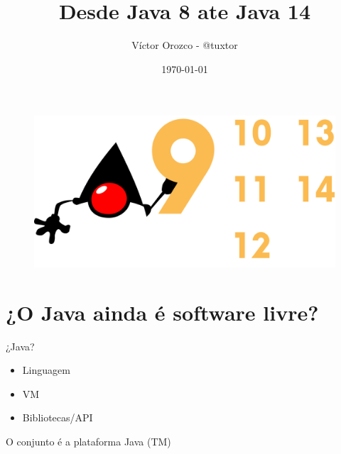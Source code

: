 \documentclass[aspectratio=169]{beamer}
\title{Desde Java 8 ate Java 14}
\author{Víctor Orozco - @tuxtor}
\institute{Academik}
\date{\today}
\begin{document}
{
    \frame{\titlepage}
}


\begin{frame}
    \tableofcontents
\end{frame}

\begin{frame}[fragile]

    \begin{figure}
        \centering
        \includegraphics[width=\linewidth]{Images/versiones}
    \end{figure}

\end{frame}

\section{¿O Java ainda é software livre?}

\begin{frame}[fragile]{¿Java?}
	\begin{itemize}
		\item Linguagem
		\item VM
		\item Bibliotecas/API
	\end{itemize}

O conjunto é a plataforma Java \pause(TM)
	
\end{frame}
\end{document}
